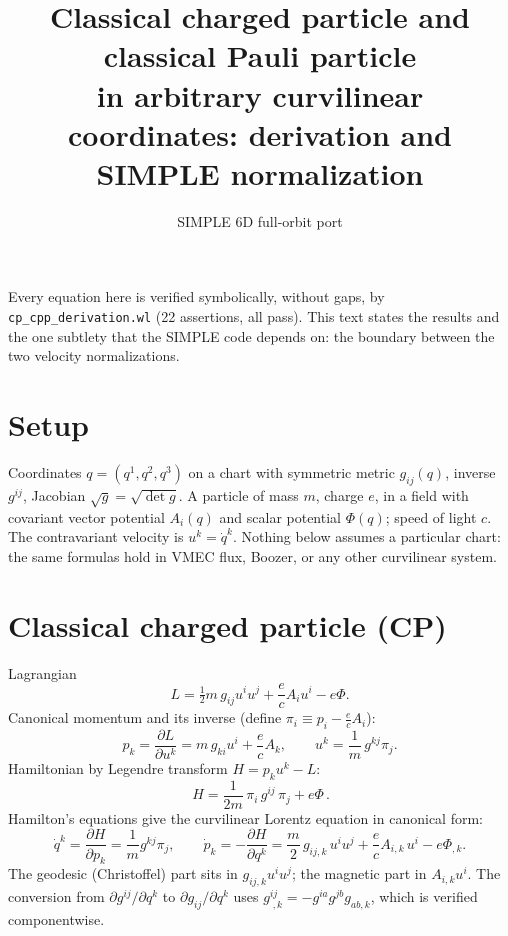 \documentclass[11pt]{article}
\title{Classical charged particle and classical Pauli particle\\
in arbitrary curvilinear coordinates: derivation and SIMPLE normalization}
\author{SIMPLE 6D full-orbit port}
\date{}
\newcommand{\half}{\tfrac12}
\begin{document}
\maketitle

\noindent
Every equation here is verified symbolically, without gaps, by
\texttt{cp\_cpp\_derivation.wl} (22 assertions, all pass). This text states the
results and the one subtlety that the SIMPLE code depends on: the boundary
between the two velocity normalizations.

\section{Setup}
Coordinates $q=(q^1,q^2,q^3)$ on a chart with symmetric metric $g_{ij}(q)$,
inverse $g^{ij}$, Jacobian $\sqrt{g}=\sqrt{\det g}$. A particle of mass $m$,
charge $e$, in a field with covariant vector potential $A_i(q)$ and scalar
potential $\Phi(q)$; speed of light $c$. The contravariant velocity is
$u^k=\dot q^k$. Nothing below assumes a particular chart: the same formulas hold
in VMEC flux, Boozer, or any other curvilinear system.

\section{Classical charged particle (CP)}
Lagrangian
\begin{equation}
L=\half m\,g_{ij}u^iu^j+\frac{e}{c}A_iu^i-e\Phi .
\end{equation}
Canonical momentum and its inverse (define $\pi_i\equiv p_i-\tfrac{e}{c}A_i$):
\begin{equation}
p_k=\frac{\partial L}{\partial u^k}=m\,g_{ki}u^i+\frac{e}{c}A_k,
\qquad
u^k=\frac1m\,g^{kj}\pi_j .
\end{equation}
Hamiltonian by Legendre transform $H=p_ku^k-L$:
\begin{equation}
\boxed{\,H=\frac{1}{2m}\,\pi_i\,g^{ij}\,\pi_j+e\Phi\,.}
\end{equation}
Hamilton's equations give the curvilinear Lorentz equation in canonical form:
\begin{equation}
\dot q^k=\frac{\partial H}{\partial p_k}=\frac1m g^{kj}\pi_j,
\qquad
\dot p_k=-\frac{\partial H}{\partial q^k}
=\frac{m}{2}\,g_{ij,k}\,u^iu^j+\frac{e}{c}A_{i,k}\,u^i-e\Phi_{,k}.
\end{equation}
The geodesic (Christoffel) part sits in $g_{ij,k}u^iu^j$; the magnetic part in
$A_{i,k}u^i$. The conversion from $\partial g^{ij}/\partial q^k$ to
$\partial g_{ij}/\partial q^k$ uses
$g^{ij}_{\;,k}=-g^{ia}g^{jb}g_{ab,k}$, which is verified componentwise.
\end{document}
